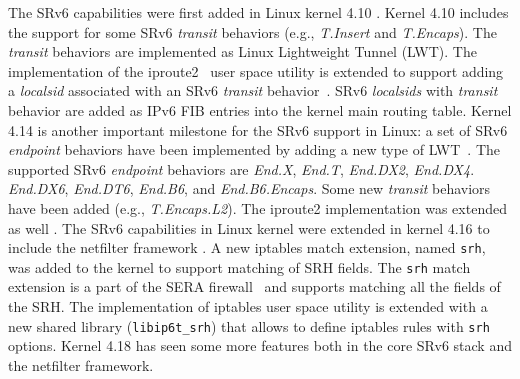 The SRv6 capabilities were first added in Linux kernel 4.10 \cite{lebrun2017implementing}. Kernel 4.10 includes the support for some SRv6 \textit{transit} behaviors (e.g., \textit{T.Insert} and \textit{T.Encaps}). The \textit{transit} behaviors are implemented as Linux Lightweight Tunnel (LWT). The implementation of the iproute2~\cite{iproute2} user space utility is extended to support adding a \textit{localsid} associated with an SRv6 \textit{transit} behavior~\cite{srv6-impl-basic}. SRv6 \textit{localsids} with \textit{transit} behavior are added as IPv6 FIB entries into the kernel main routing table. Kernel 4.14 is another important milestone for the SRv6 support in Linux: a set of SRv6 \textit{endpoint} behaviors have been implemented by adding a new type of LWT~\cite{lebrun2017reaping}. The supported SRv6 \textit{endpoint} behaviors are \textit{End.X}, \textit{End.T}, \textit{End.DX2}, \textit{End.DX4}. \textit{End.DX6}, \textit{End.DT6}, \textit{End.B6}, and \textit{End.B6.Encaps}. Some new \textit{transit} behaviors have been added (e.g., \textit{T.Encaps.L2}). The iproute2 implementation was extended as well \cite{iproute2} \cite{srv6-impl-adv}. The SRv6 capabilities in Linux kernel were extended in kernel 4.16 \cite{kernel4-16} to include the netfilter framework \cite{netfilter}. A new iptables match extension, named \texttt{srh}, was added to the kernel to support matching of SRH fields. The \texttt{srh} match extension is a part of the SERA firewall~\cite{paper-sera} and supports matching all the fields of the SRH. The implementation of iptables user space utility \cite{wiki-iptables} is extended with a new shared library (\texttt{libip6t\_srh}) that allows to define iptables rules with \texttt{srh} options. Kernel 4.18 \cite{kernel4-18} has seen some more features both in the core SRv6 stack and the netfilter framework. 

